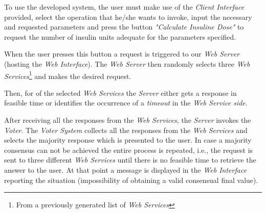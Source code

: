 To use the developed system, the user must make use of the \emph{Client Interface} provided, select the operation that he/she wants to invoke, input the necessary and requested parameters and  press the button \emph{"Calculate Insuline Dose"} to request the number of insulin units adequate for the parameters specified.

When the user presses this button a request is triggered to our \emph{Web Server} (hosting the \emph{Web Interface}). The \emph{Web Server} then randomly selects three \emph{Web Services}\footnote{From a previously generated list of \emph{Web Services}} and makes the desired request.

Then, for of the selected \emph{Web Services} the \emph{Server} either gets a response in feasible time or identifies the occurrence of a \emph{timeout} in the \emph{Web Service side}.

After receiving all the responses from the \emph{Web Services}, the \emph{Server} invokes the \emph{Voter}. The \emph{Voter System} collects all the responses from the \emph{Web Services} and selects the majority response which is presented to the user. In case a majority consensus can not be achieved the entire process is repeated, i.e., the request is sent to three different \emph{Web Services}  until there is no feasible time to retrieve the answer to the user. At that point a message is displayed in the \emph{Web Interface} reporting the situation (impossibility of obtaining a valid consensual final value).